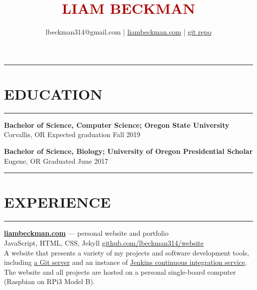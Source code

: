 \documentclass[a4paper]{article}
\title{\textcolor[HTML]{AA0000}{LIAM BECKMAN}}
\author{lbeckman314@gmail.com |  \href{https://liambeckman.com}{liambeckman.com} | \href{https://github.com/lbeckman314}{git repo}}
\date{\vspace{-5ex}}
\begin{document}
\maketitle

\rule{\textwidth}{1pt}\vspace{-1.5em}
\section*{\large{EDUCATION}}\vspace{-1.5em}
\textcolor[RGB]{128,128,128}{\rule{\linewidth}{1pt}}

\medbreak

\textbf{Bachelor of Science, Computer Science; Oregon State University}\\ 
\textcolor[RGB]{128,128,128}{Corvallis, OR \hfill Expected graduation Fall 2019}

\textcolor[RGB]{128,128,128}{\dotfill}
\medbreak

\textbf{Bachelor of Science, Biology; University of Oregon Presidential Scholar}\\ 
\textcolor[RGB]{128,128,128}{Eugene, OR \hfill Graduated June 2017}

\medbreak

\noindent\rule{\textwidth}{1pt}\vspace{-1.5em}
\section*{\large{EXPERIENCE}}\vspace{-1.5em}
\textcolor[RGB]{128,128,128}{\rule{\linewidth}{1pt}}


\textcolor[HTML]{4635f7}{\textbf{\href{https://liambeckman.com}{liambeckman.com}}} --- personal website and portfolio\\
\textcolor[RGB]{128,128,128}{JavaScript, HTML, CSS, Jekyll \hfill \href{https://github.com/lbeckman314/website}{github.com/lbeckman314/website}}\\

A website that presents a variety of my projects and software development tools, including \href{https://git.liambeckman.com}{a Git server} and an instance of \href{https://liambeckman.com/jenkins}{Jenkins continuous integration service}. The website and all projects are hosted on a personal single-board computer (Raspbian on RPi3 Model B).

\textcolor[RGB]{128,128,128}{\dotfill}
\medbreak
\end{document}
